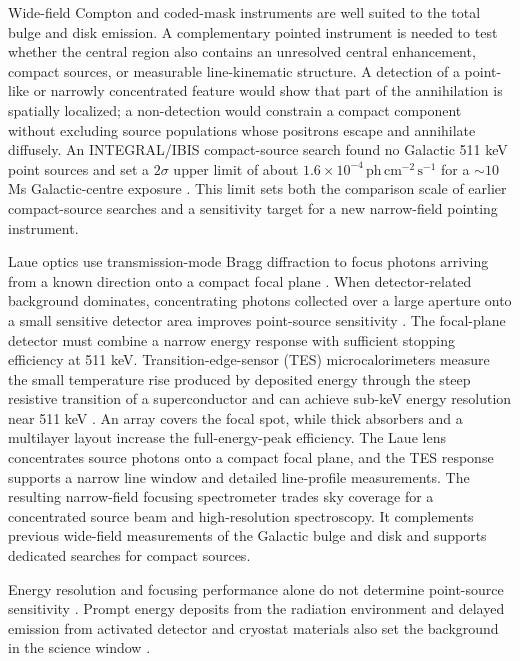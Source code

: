 \documentclass[11pt]{article}
\newcommand{\phcms}{\ensuremath{\,\mathrm{ph\,cm^{-2}\,s^{-1}}}}
\begin{document}
Wide-field Compton and coded-mask instruments are well suited to the total
bulge and disk emission. A complementary pointed instrument is needed to test
whether the central region also contains an unresolved central enhancement,
compact sources, or measurable line-kinematic structure. A detection of a
point-like or narrowly concentrated feature would show that part of the
annihilation is spatially localized; a non-detection would constrain a compact
component without excluding source populations whose positrons escape and
annihilate diffusely. An INTEGRAL/IBIS compact-source search found no Galactic
511 keV point sources and set a $2\sigma$ upper limit of about
$1.6\times10^{-4}\phcms$ for a $\sim10$ Ms Galactic-centre exposure
\cite{DeCesare2011}. This limit sets both the comparison scale of earlier
compact-source searches and a sensitivity target for a new narrow-field
pointing instrument.

Laue optics use transmission-mode Bragg diffraction to focus photons arriving
from a known direction onto a compact focal plane
\cite{Barriere2009Laue,Barriere2011LauePrototype}. When detector-related
background dominates, concentrating photons collected over a large aperture
onto a small sensitive detector area improves point-source sensitivity
\cite{Weidenspointner2006MAX}. The focal-plane detector must combine a narrow
energy response with sufficient stopping efficiency at 511 keV.
Transition-edge-sensor (TES) microcalorimeters measure the small temperature
rise produced by deposited energy through the steep resistive transition of a
superconductor and can achieve sub-keV energy resolution near 511 keV
\cite{Shirazi2023,Zhang2022TESGamma}. An array covers the focal spot, while thick
absorbers and a multilayer layout increase the full-energy-peak efficiency. The
Laue lens concentrates source photons onto a compact focal plane, and the TES
response supports a narrow line window and detailed line-profile measurements.
The resulting narrow-field focusing spectrometer trades sky coverage for a
concentrated source beam and high-resolution spectroscopy. It complements
previous wide-field measurements of the Galactic bulge and disk and supports
dedicated searches for compact sources.

Energy resolution and focusing performance alone do not determine point-source
sensitivity \cite{Shirazi2023,Hu2026}. Prompt energy deposits from the radiation
environment and delayed emission from activated detector and cryostat materials
also set the background in the science window
\cite{Gallego2025Balloon,Tian2026DIXE}.
\end{document}
